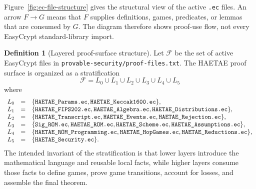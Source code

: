 \documentclass[11pt]{report}
\newcommand{\file}[1]{\nolinkurl{#1}}
\theoremstyle{definition}
\newtheorem{formaldefinition}{Definition}[chapter]
\theoremstyle{plain}
\theoremstyle{definition}
\begin{document}
Figure~\ref{fig:ec-file-structure} gives the structural view of the active
\file{.ec} files.  An arrow \(F\to G\) means that \(F\) supplies definitions,
games, predicates, or lemmas that are consumed by \(G\).  The diagram therefore
shows proof-use flow, not every EasyCrypt standard-library import.



\begin{formaldefinition}[Layered proof-surface structure]
Let \(\mathcal{F}\) be the set of active EasyCrypt files in
\file{provable-security/proof-files.txt}.  The HAETAE proof surface is
organized as a stratification
\[
  \mathcal{F}
  =
  L_0\cup L_1\cup L_2\cup L_3\cup L_4\cup L_5
\]
where
\[
\begin{array}{rcl}
L_0 &=& \{\text{\normalfont\ttfamily HAETAE\_Params.ec},
          \text{\normalfont\ttfamily HAETAE\_Keccak1600.ec}\},\\
L_1 &=& \{\text{\normalfont\ttfamily HAETAE\_FIPS202.ec},
          \text{\normalfont\ttfamily HAETAE\_Algebra.ec},
          \text{\normalfont\ttfamily HAETAE\_Distributions.ec}\},\\
L_2 &=& \{\text{\normalfont\ttfamily HAETAE\_Transcript.ec},
          \text{\normalfont\ttfamily HAETAE\_Events.ec},
          \text{\normalfont\ttfamily HAETAE\_Rejection.ec}\},\\
L_3 &=& \{\text{\normalfont\ttfamily Sig\_ROM.ec},
          \text{\normalfont\ttfamily HAETAE\_ROM.ec},
          \text{\normalfont\ttfamily HAETAE\_Scheme.ec},
          \text{\normalfont\ttfamily HAETAE\_Assumptions.ec}\},\\
L_4 &=& \{\text{\normalfont\ttfamily HAETAE\_ROM\_Programming.ec},
          \text{\normalfont\ttfamily HAETAE\_HopGames.ec},
          \text{\normalfont\ttfamily HAETAE\_Reductions.ec}\},\\
L_5 &=& \{\text{\normalfont\ttfamily HAETAE\_Security.ec}\}.
\end{array}
\]
The intended invariant of the stratification is that lower layers introduce
the mathematical language and reusable local facts, while higher layers consume
those facts to define games, prove game transitions, account for losses, and
assemble the final theorem.
\end{formaldefinition}
\end{document}
